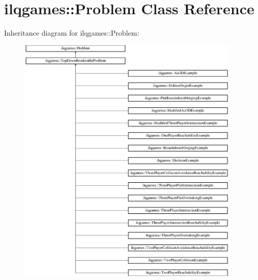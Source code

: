 \hypertarget{classilqgames_1_1_problem}{}\section{ilqgames\+:\+:Problem Class Reference}
\label{classilqgames_1_1_problem}
Inheritance diagram for ilqgames\+:\+:Problem\+:\begin{figure}[H]
\begin{center}
\leavevmode
\includegraphics[height=12.000000cm]{classilqgames_1_1_problem}
\end{center}
\end{figure}

